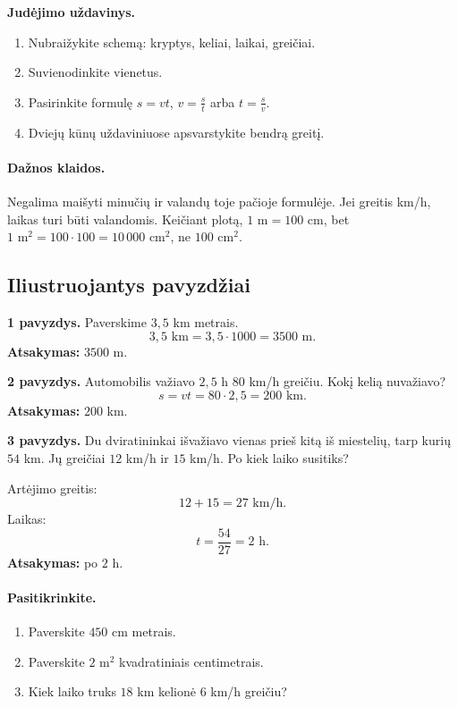 \textbf{Judėjimo uždavinys.}
\begin{enumerate}[label=\arabic*.]
\item Nubraižykite schemą: kryptys, keliai, laikai, greičiai.
\item Suvienodinkite vienetus.
\item Pasirinkite formulę \(s=vt\), \(v=\frac{s}{t}\) arba \(t=\frac{s}{v}\).
\item Dviejų kūnų uždaviniuose apsvarstykite bendrą greitį.
\end{enumerate}

\paragraph{Dažnos klaidos.}
Negalima maišyti minučių ir valandų toje pačioje formulėje. Jei greitis km/h, laikas turi būti valandomis. Keičiant plotą, \(1\text{ m}=100\text{ cm}\), bet \(1\text{ m}^2=100\cdot 100=10\,000\text{ cm}^2\), ne \(100\text{ cm}^2\).

\subsection{Iliustruojantys pavyzdžiai}
\textbf{1 pavyzdys.} Paverskime \(3,5\) km metrais.
\[
3,5\text{ km}=3,5\cdot 1000=3500\text{ m}.
\]
\textbf{Atsakymas:} \(3500\) m.

\textbf{2 pavyzdys.} Automobilis važiavo \(2,5\) h \(80\) km/h greičiu. Kokį kelią nuvažiavo?
\[
s=vt=80\cdot 2,5=200\text{ km}.
\]
\textbf{Atsakymas:} \(200\) km.

\textbf{3 pavyzdys.} Du dviratininkai išvažiavo vienas prieš kitą iš miestelių, tarp kurių \(54\) km. Jų greičiai \(12\) km/h ir \(15\) km/h. Po kiek laiko susitiks?

Artėjimo greitis:
\[
12+15=27\text{ km/h}.
\]
Laikas:
\[
t=\frac{54}{27}=2\text{ h}.
\]
\textbf{Atsakymas:} po \(2\) h.

\paragraph{Pasitikrinkite.}
\begin{enumerate}[label=\arabic*.]
\item Paverskite \(450\) cm metrais.
\item Paverskite \(2\text{ m}^2\) kvadratiniais centimetrais.
\item Kiek laiko truks \(18\) km kelionė \(6\) km/h greičiu?
\end{enumerate}

